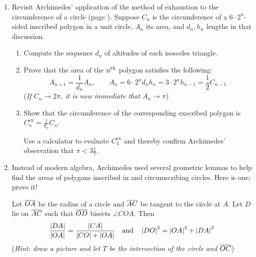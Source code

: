 \begin{exercises}
\begin{enumerate}
	  
	  \item Revisit Archimedes' application of the method of exhaustion to the circumference of a circle (page \pageref{pg:archquadcircle}). Suppose $C_n$ is the circumference of a $6\cdot 2^n$-sided inscribed polygon in a unit circle, $A_n$ its area, and $d_n,h_n$ lengths in that discussion.
	  \begin{enumerate}
	    \item Compute the sequence $d_n$ of altitudes of each isosceles triangle.
	    
	    \item Prove that the area of the $n\textsuperscript{th}$ polygon satisfies the following:
	    \[
	    	A_{n+1}=\frac 1{d_n}A_n,\qquad A_n=6\cdot 2^nd_nh_n=3\cdot 2^n h_{n-1} =\frac 12C_{n-1}
	    \]
	    (\emph{If $C_n\to 2\pi$, it is now immediate that $A_n\to\pi$})
	    
	    \item Show that the circumference of the corresponding exscribed polygon is $C^{\text{ex}}_n=\frac 1{d_n}C_n$.\par
	    Use a calculator to evaluate $C_4^{\text{ex}}$ and thereby confirm Archimedes' observation that $\pi<3\frac 17$.
	  \end{enumerate}
	  
	  
	  \item\label{exs:archlemma}%
	  Instead of modern algebra, Archimedes used several geometric lemmas to help find the areas of polygons inscribed in and circumscribing circles. Here is one; prove it!\par
	  Let $\overline{OA}$ be the radius of a circle and $\overline{AC}$ be tangent to the circle at $A$. Let $D$ lie on $\overline{AC}$ such that $\overline{OD}$ bisects $\angle COA$. Then
	  \[
	  	\frac{\left| DA\right|}{\left| OA\right|}=\frac{\left| CA\right|}{\left| CO\right|+\left| OA\right|}\quad\text{and}\quad \left| DO\right|^2=\left| OA\right|^2+\left| DA\right|^2
	  \]
	  (\emph{Hint: draw a picture and let $T$ be the intersection of the circle and $\overline{OC}$})
	 

\end{enumerate}
\end{exercises}
